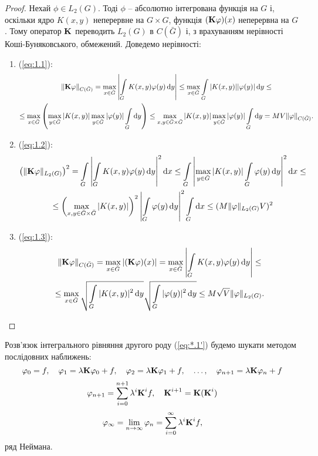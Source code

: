 \begin{proof}
	Нехай $\phi \in L_2(G)$. Тоді $\phi$ -- абсолютно інтегрована функція на $G$ і, оскільки ядро $K(x, y)$ неперервне на $G \times G$, функція $(\bf{K}\phi)(x)$ неперервна на $G$. Тому оператор $\bf{K}$ переводить $L_2(G)$ в $C(\bar G)$ і, з врахуванням нерівності Коші-Буняковського, обмежений. Доведемо нерівності:
	\begin{enumerate}
		\item (\ref{eq:1.1}):
		\begin{multline*}
			\| \bf{K} \phi \|_{C(\bar G)} = \Max_{x \in \bar G} \left| \Int_G K(x, y) \phi(y) \diff y \right| \le \Max_{x \in \bar G} \Int_G |K(x, y)| |\phi(y)| \diff y \le \\
			\le \Max_{x \in \bar G} \left( \Max_{y \in \bar G} |K(x, y)| \Max_{y \in \bar G} |\phi(y)| \Int_G \diff y \right) \le \Max_{x, y \in \bar G \times \bar G} |K(x, y)| \Max_{y \in \bar G} |\phi(y)| \Int_G \diff y = M V \|\phi\|_{C(\bar G)}.
		\end{multline*}
		\item (\ref{eq:1.2}):
		\begin{multline*}
			\left( \| \bf{K} \phi \|_{L_2(G)} \right)^2 = \Int_G \left| \Int_G K(x, y) \phi(y) \diff y \right|^2 \diff x \le \Int_G \left| \Max_{y \in \bar G} |K(x, y)| \Int_G \phi(y) \diff y \right|^2 \diff x \le \\
			\le \left( \Max_{x, y \in \bar G \times \bar G} |K(x, y)| \right)^2 \left| \Int_G \phi(y) \diff y \right|^2 \Int_G \diff x \le (M \| \phi\|_{L_2(G)} V)^2
		\end{multline*}
		\item (\ref{eq:1.3}):
		\begin{multline*}
			\| \bf{K} \phi \|_{C(\bar G)} = \Max_{x \in \bar G} |(\bf{K} \phi) (x)| = \Max_{x \in \bar G} \left| \Int_G K(x, y) \phi(y) \diff y \right| \le \\
			\le \Max_{x \in \bar G} \sqrt{\Int_G |K(x, y)|^2 \diff y} \sqrt{\Int_G |\phi(y)|^2 \diff y} \le M \sqrt{V} \|\phi\|_{L_2(G)}.
		\end{multline*}
	\end{enumerate}
\end{proof}

Розв’язок інтегрального рівняння другого роду (\ref{eq:*.1'}) будемо шукати методом послідовних наближень:
\begin{equation}
	\label{eq:1.10}
	\phi_0 = f, \quad \phi_1 = \lambda \bf{K} \phi_0 + f, \quad \phi_2 = \lambda \bf{K} \phi_1 + f, \quad \ldots, \quad \phi_{n + 1} = \lambda \bf{K} \phi_n + f
\end{equation}
\begin{equation}
	\label{eq:1.11}
	\phi_{n + 1} = \Sum_{i = 0}^{n + 1} \lambda^i \bf{K}^i f, \quad \bf{K}^{i + 1} = \bf{K} (\bf{K}^i)
\end{equation}
\begin{equation}
	\label{eq:1.12}
	\phi_\infty = \Lim_{n \to \infty} \phi_{n} = \Sum_{i = 0}^\infty \lambda^i \bf{K}^i f,
\end{equation}
ряд Неймана. \\

